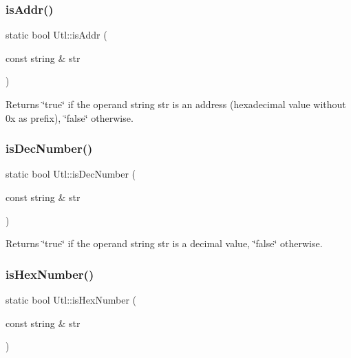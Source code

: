 \subsubsection{\texorpdfstring{is\+Addr()}{isAddr()}}
{\footnotesize\ttfamily static bool Utl\+::is\+Addr (\begin{DoxyParamCaption}\item[{const string \&}]{str }\end{DoxyParamCaption})\hspace{0.3cm}{\ttfamily [static]}}

\begin{DoxyReturn}{Returns}
\char`\"{}true\char`\"{} if the operand string str is an address (hexadecimal value without 0x as prefix), \char`\"{}false\char`\"{} otherwise. 
\end{DoxyReturn}
\mbox{\label{classUtl_aac43171c1e74d7a08caa35ea8652ae67}} 
\subsubsection{\texorpdfstring{is\+Dec\+Number()}{isDecNumber()}}
{\footnotesize\ttfamily static bool Utl\+::is\+Dec\+Number (\begin{DoxyParamCaption}\item[{const string \&}]{str }\end{DoxyParamCaption})\hspace{0.3cm}{\ttfamily [static]}}

\begin{DoxyReturn}{Returns}
\char`\"{}true\char`\"{} if the operand string str is a decimal value, \char`\"{}false\char`\"{} otherwise. 
\end{DoxyReturn}
\mbox{\label{classUtl_a67659f76738d22fab7abfdeaa35b72c5}} 
\subsubsection{\texorpdfstring{is\+Hex\+Number()}{isHexNumber()}}
{\footnotesize\ttfamily static bool Utl\+::is\+Hex\+Number (\begin{DoxyParamCaption}\item[{const string \&}]{str }\end{DoxyParamCaption})\hspace{0.3cm}{\ttfamily [static]}}

